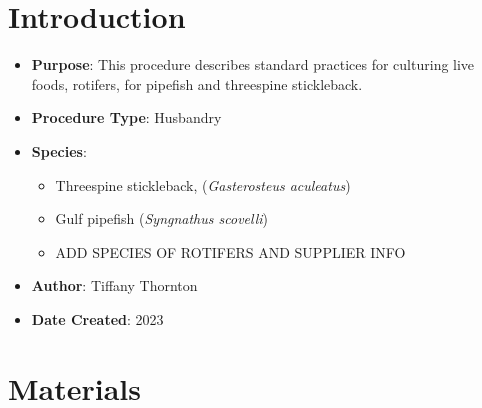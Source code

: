 \documentclass[
  letterpaper,
  DIV=11,
  numbers=noendperiod]{scrreprt}
\providecommand{\tightlist}{%
  \setlength{\itemsep}{0pt}\setlength{\parskip}{0pt}}\usepackage{longtable,booktabs,array}
\begin{document}
\hypertarget{introduction-46}{%
\section{Introduction}\label{introduction-46}}

\begin{itemize}
\tightlist
\item
  \textbf{Purpose}: This procedure describes standard practices for
  culturing live foods, rotifers, for pipefish and threespine
  stickleback.
\item
  \textbf{Procedure Type}: Husbandry
\item
  \textbf{Species}:

  \begin{itemize}
  \tightlist
  \item
    Threespine stickleback, (\emph{Gasterosteus aculeatus})
  \item
    Gulf pipefish (\emph{Syngnathus scovelli})
  \item
    ADD SPECIES OF ROTIFERS AND SUPPLIER INFO
  \end{itemize}
\item
  \textbf{Author}: Tiffany Thornton
\item
  \textbf{Date Created}: 2023
\end{itemize}

\hypertarget{materials-44}{%
\section{Materials}\label{materials-44}}
\end{document}
